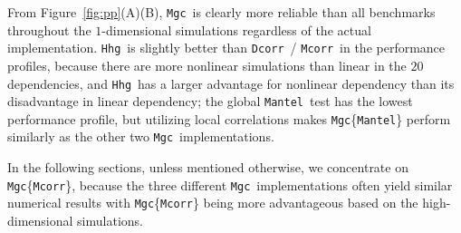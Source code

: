 \documentclass[11pt]{article}
\providecommand{\sct}[1]{{\sc \texttt{#1}}}
\newcommand{\subfigimg}[3][,]{%
  \setbox1=\hbox{\texttt{[image: \#3]}}%
  \leavevmode\rlap{\usebox1}%
  \rlap{\hspace*{12pt}\raisebox{\dimexpr\ht1-0\baselineskip}{#2}}%
  \phantom{\usebox1}%
}
\newcommand{\Mgc}{\sct{Mgc}}
\newcommand{\Hhg}{\sct{Hhg}}
\newcommand{\Dcorr}{\sct{Dcorr}}
\newcommand{\Mcorr}{\sct{Mcorr}}
\newcommand{\Mantel}{\sct{Mantel}}
\begin{document}

From Figure~\ref{fig:pp}(A)(B), \Mgc~is clearly more reliable than all benchmarks throughout the $1$-dimensional simulations regardless of the actual implementation. \Hhg~is slightly better than \Dcorr~/ \Mcorr~in the performance profiles, because there are more nonlinear simulations than linear in the $20$ dependencies, and \Hhg~has a larger advantage for nonlinear dependency than its disadvantage in linear dependency; the global \Mantel~test has the lowest performance profile, but utilizing local correlations makes \Mgc\{\Mantel\} perform similarly as the other two \Mgc~implementations.

In the following sections, unless mentioned otherwise, we concentrate on \Mgc\{\Mcorr\}, because the three different \Mgc~implementations often yield similar numerical results with \Mgc\{\Mcorr\} being more advantageous based on the high-dimensional simulations.
\end{document}
